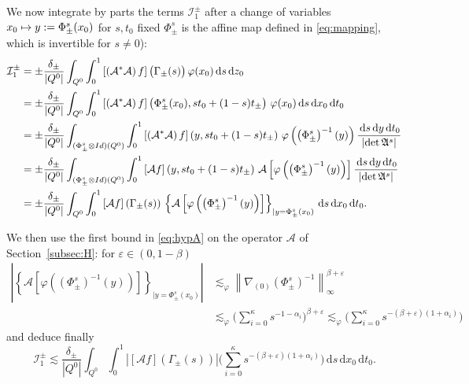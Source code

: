 \documentclass[10pt,a4paper]{amsart}
\newcommand\mto{\mathchoice{\longmapsto}{\mapsto}{\mapsto}{\mapsto}}
\let\epsilon\varepsilon
\theoremstyle{definition}
\newcommand{\cA}{{\mathcal A}}
\newcommand{\cI}{{\mathcal I}}
\newcommand{\I}{\textup{Id}}\let\Id\I
\newcommand{\dd}{{\, \mathrm d}}
\begin{document}
We now integrate by parts the terms $\cI^\pm _1$ after a
change of variables $x_0 \mto y:= \Phi^s_\pm(x_0)$ for
$s,t_0$ fixed $\Phi^s_\pm$ is the affine map defined in \eqref{eq:mapping}, which is invertible for $s
\not =0$):
\begin{equation*}
\begin{aligned}
\cI_1^\pm & = \pm\frac{\delta_\pm}{|Q^0|} \int_{Q^0} \int_0^1
\left[ \left(\mathcal A^* \mathcal A \right) f\right]
\big(\Gamma_\pm(s)\big) \, \varphi(x_0)\dd s\dd z_0 \\
& = \pm\frac{\delta_\pm}{|Q^0|}\int_{Q^0} \int_0^1
\left[ \left(\mathcal A^* \mathcal A \right) f\right]
\left(\Phi^s_\pm (x_0),st_0 + (1-s)t_\pm
\right) \, \varphi(x_0)\dd s\dd x_0 \dd t_0 \\
& = \pm \frac{\delta_\pm}{|Q^0|} \int_{(\Phi^s_\pm \otimes \I)(Q^0)} \int_0^1
\left[ \left(\mathcal A^* \mathcal A \right) f\right]
\left(y,st_0 + (1-s)t_\pm \right) \, \varphi
\left(\left(\Phi^s_\pm\right)^{-1}(y)\right) \frac{\dd s
\dd y \dd t_0}{\left| \det \mathfrak
A^s \right|} \\
& = \pm \frac{\delta_\pm}{|Q^0|} \int_{(\Phi^s_\pm \otimes
\I)(Q^0)} \int_0^1 \left[ \mathcal A f\right]
\left(y,st_0 + (1-s)t_\pm \right) \, \cA\left[\varphi
\left(\left(\Phi^s_\pm \right)^{-1} (y)\right)\right]
\frac{\dd s \dd y \dd t_0}{\left| \det \mathfrak A^s \right|} \\
& = \pm \frac{\delta_\pm}{|Q^0|} \int_{Q^0} \int_0^1
\left[ \mathcal A f\right]
\left(\Gamma_\pm(s) \right) \, \left\{ \cA\left[\varphi
\left(\left(\Phi^s_\pm \right)^{-1} (y)\right)\right]
\right\}_{|y=\Phi^s_\pm(x_0)} \dd s \dd x_0 \dd t_0.
\end{aligned}
\end{equation*}

We then use the first bound in \eqref{eq:hypA} on the operator $\mathcal A$ of Section~\ref{subsec:H}: for $\epsilon \in (0, 1-\beta)$
\begin{align*}
\left| \left\{ \cA\left[\varphi
\left(\left(\Phi^s_\pm \right)^{-1} (y)\right)\right]
\right\}_{|y=\Phi^s_\pm(x_0)} \right|
& \lesssim_\varphi
\left\| \nabla_{(0)} \left(\Phi^s_\pm \right)^{-1}
\right\|_\infty ^{\beta +\epsilon}\\
& \lesssim_\varphi \biggl(\sum_{i=0} ^\kappa s^{-1-\alpha_i}
\biggr)^{\beta +\epsilon} \lesssim_\varphi \biggl(\sum_{i=0} ^\kappa
s^{-(\beta+\epsilon)(1+\alpha_i)} \biggr)
\end{align*}
and deduce finally
\begin{equation*}
\cI_1^\pm \lesssim \frac{\delta_\pm}{|Q^0|} \int_{Q^0} \int_0^1
\left| \left[ \mathcal A f\right]
\left(\Gamma_\pm(s) \right) \right| \biggl(\sum_{i=0}
^\kappa s^{-(\beta+\epsilon)(1+\alpha_i)} \biggr) \dd s \dd x_0 \dd
t_0.
\end{equation*}
\end{document}
